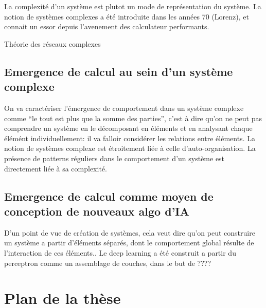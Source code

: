 \documentclass[../main]{subfiles}
\begin{document}
La complexité d'un système est plutot un mode de représentation du système. La notion de systèmes complexes a été introduite dans les années 70 (Lorenz), et connait un essor depuis l'avenement des calculateur performants. 

Théorie des réseaux complexes

\subsection*{Emergence de calcul au sein d'un système complexe}

On va caractériser l'émergence de comportement dans un système complexe comme “le tout est plus que la somme des parties”, c'est à dire qu'on ne peut pas comprendre un système en le décomposant en éléments et en analysant chaque élémént individuellement: il va falloir considérer les relations entre éléments. 
La notion de systèmes complexe est étroitement liée à celle d'auto-organisation. La présence de patterns réguliers dans le comportement d'un système est directement liée à sa complexité.

\subsection*{Emergence de calcul comme moyen de conception de nouveaux algo d'IA}

D'un point de vue de création de systèmes, cela veut dire qu'on peut construire un système a partir d'éléments séparés, dont le comportement global résulte de l'interaction de ces éléments..
Le deep learning a été construit a partir du perceptron comme un assemblage de couches, dans le but de ????

\section*{ Plan de la thèse}
\end{document}
